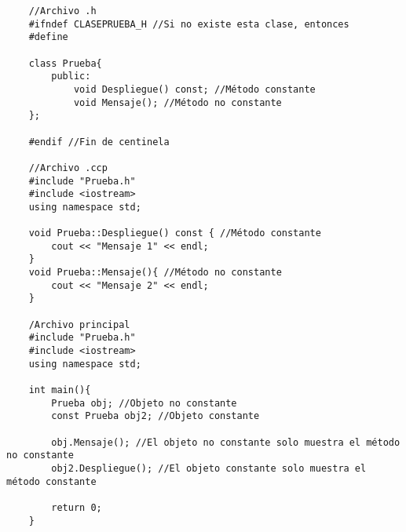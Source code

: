 \begin{lstlisting}
    //Archivo .h
    #ifndef CLASEPRUEBA_H //Si no existe esta clase, entonces
    #define
    
    class Prueba{
        public:
            void Despliegue() const; //Método constante
            void Mensaje(); //Método no constante
    };
    
    #endif //Fin de centinela
    
    //Archivo .ccp
    #include "Prueba.h"
    #include <iostream>
    using namespace std;
    
    void Prueba::Despliegue() const { //Método constante
        cout << "Mensaje 1" << endl;
    }
    void Prueba::Mensaje(){ //Método no constante
        cout << "Mensaje 2" << endl;
    }
    
    /Archivo principal
    #include "Prueba.h"
    #include <iostream>
    using namespace std;
    
    int main(){
        Prueba obj; //Objeto no constante
        const Prueba obj2; //Objeto constante
        
        obj.Mensaje(); //El objeto no constante solo muestra el método no constante
        obj2.Despliegue(); //El objeto constante solo muestra el método constante
        
        return 0;
    }
\end{lstlisting}




